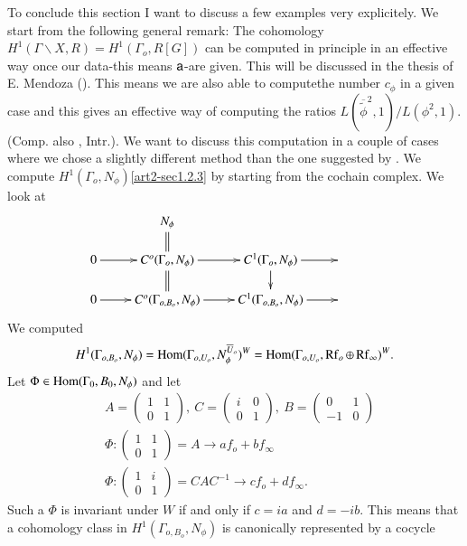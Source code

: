 To conclude this section I want to discuss a few examples very explicitely. We start from the following general remark: The cohomology $H^{1}(\Gamma\backslash X,R)=H^{1}(\Gamma_{o},R[G])$ can be computed in principle in an effective way once our data-this means $\mathsf{a}$-are given. This will be discussed in the thesis of E. Mendoza (\cite{art2-key15}). This means we are also able to compute\pageoriginale the number $c_{\phi}$ in a given case and this gives an effective way of computing the ratios $L(\overline{\widetilde{\phi}}^{2},1)/L(\phi^{2},1)$. (Comp. also \cite{art2-key23}, Intr.). We want to discuss this computation in a couple of cases where we chose a slightly different method than the one suggested by \cite{art2-key15}. We compute $H^{1}(\Gamma_{o},N_{\phi})$\eqref{art2-sec1.2.3} by starting from the cochain complex. We look at
\[
\xymatrix@R=.5cm{
 & N_{\phi}\ar@{=}[d] & & &\\
0\ar[r] & C^{o}(\Gamma_{o},N_{\phi})\ar@{=}[d]\ar[r] & C^{1}(\Gamma_{o},N_{\phi})\ar[r]\ar[d] &\\
0\ar[r] & C^{o}(\Gamma_{o,B_{o}},N_{\phi})\ar[r] & C^{1}(\Gamma_{o,B_{o}},N_{\phi})\ar[r] &
}
\]
We computed 
$$
H^{1}(\Gamma_{o,B_{o}},N_{\phi})=\operatorname{Hom}(\Gamma_{o,U_{o}},N^{\overline{U}_{o}}_{\phi})^{W}=\operatorname{Hom}(\Gamma_{o,U_{o}},\operatorname{Rf}_{o}\oplus \operatorname{Rf}_{\infty})^{W}.
$$ 
Let $\Phi\in \operatorname{Hom}(\Gamma_{0},B_{0},N_{\phi})$ and let
\begin{align*}
& A=\left(\begin{matrix} 1 & 1\\ 0 & 1\end{matrix}\right), \ C=\left(\begin{matrix} i & 0\\ 0 & 1\end{matrix}\right), \ B=\left(\begin{matrix} 0 & 1\\ -1 & 0\end{matrix}\right)\\[4pt]
& \Phi : \left(\begin{matrix} 1 & 1\\ 0 & 1\end{matrix}\right)=A\to af_{o}+bf_{\infty}\\[4pt]
& \Phi : \left(\begin{matrix} 1 & i\\ 0 & 1\end{matrix}\right)=CAC^{-1}\to cf_{o}+df_{\infty}.
\end{align*}
Such a $\Phi$ is invariant under $W$ if and only if $c=ia$ and $d=-ib$. This means that a cohomology class in $H^{1}(\Gamma_{o,B_{o}},N_{\phi})$ is canonically represented by a cocycle
